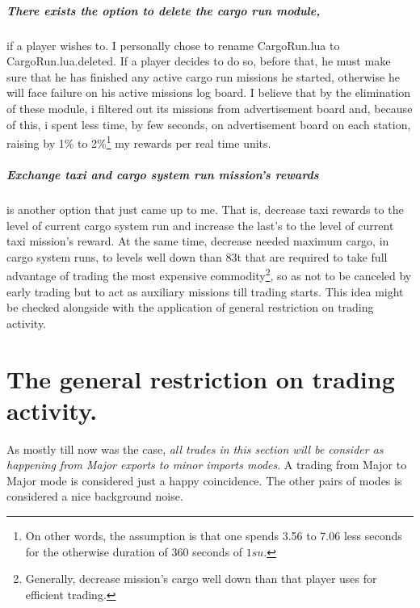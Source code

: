 \documentclass[]{article}
\begin{document}
\subparagraph*{There exists the option to delete the cargo run module,} if a player wishes to. I personally chose to rename CargoRun.lua to CargoRun.lua.deleted. If a player decides to do so, before that, he must make sure that he has finished any active cargo run missions he started, otherwise he will face failure on his active missions log board. I believe that by the elimination of these module, i filtered out its missions from advertisement board and, because of this, i spent less time, by few seconds, on advertisement board on each station, raising by 1\% to 2\%\footnote{On other words, the assumption is that one spends 3.56 to 7.06 less seconds for the otherwise duration of 360 seconds of $1su.$} my rewards per real time units.
\subparagraph*{Exchange taxi and cargo system run mission's rewards} is another option that just came up to me. That is, decrease taxi rewards to the level of current cargo system run and increase the last's to the level of current taxi mission's reward. At the same time, decrease needed maximum cargo, in cargo system runs, to levels well down than 83t that are required to take full advantage of trading the most expensive commodity\footnote{Generally, decrease mission's cargo well down than that player uses for efficient trading.}, so as not to be canceled by early trading but to act as auxiliary missions till trading starts. This idea might be checked alongside with the application of general restriction on trading activity.
\section{The general restriction on trading activity.}
 As  mostly till now was the case, \emph{all trades in this section will be consider as happening from Major exports to minor imports modes}. A trading from Major to Major mode is considered just a happy coincidence. The other pairs of modes is considered a nice background noise.
\end{document}

